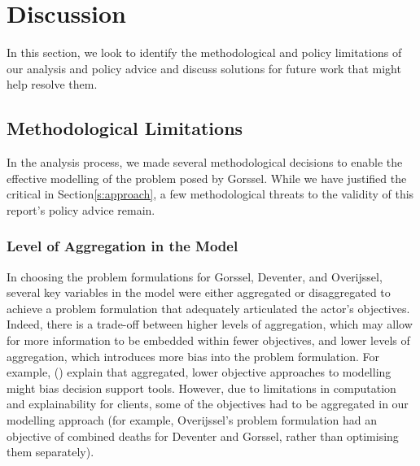 \section{Discussion}
\label{s:discussion}



In this section, we look to identify the methodological and policy limitations of our analysis and policy advice and discuss solutions for future work that might help resolve them.

\subsection{Methodological Limitations}
In the analysis process, we made several methodological decisions to enable the effective modelling of the problem posed by Gorssel. While we have justified the critical in Section\ref{s:approach}, a few methodological threats to the validity of this report's policy advice remain.

\subsubsection{Level of Aggregation in the Model}
In choosing the problem formulations for Gorssel, Deventer, and Overijssel, several key variables in the model were either aggregated or disaggregated to achieve a problem formulation that adequately articulated the actor's objectives. Indeed, there is a trade-off between higher levels of aggregation, which may allow for more information to be embedded within fewer objectives, and lower levels of aggregation, which introduces more bias into the problem formulation. For example, \citeauthor{kasprzyk_battling_2016} (\citeyear{kasprzyk_battling_2016}) explain that aggregated, lower objective approaches to modelling might bias decision support tools. However, due to limitations in computation and explainability for clients, some of the objectives had to be aggregated in our modelling approach (for example, Overijssel's problem formulation had an objective of combined deaths for Deventer and Gorssel, rather than optimising them separately).

